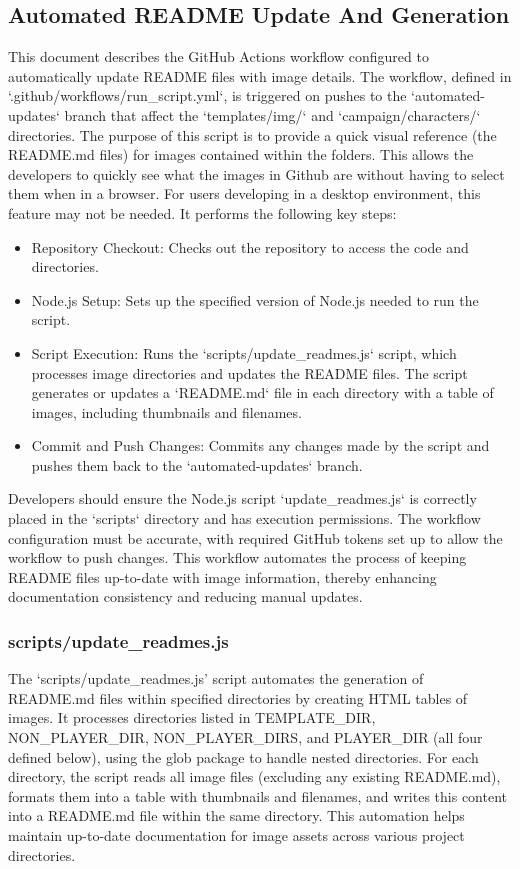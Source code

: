 \subsection{Automated README Update And Generation}


This document describes the GitHub Actions workflow configured to automatically update README files with image details. The workflow, defined in `.github/workflows/run\_script.yml`, is triggered on pushes to the `automated-updates` branch that affect the `templates/img/` and `campaign/characters/` directories. The purpose of this script is to provide a quick visual reference (the README.md files) for images contained within the folders. This allows the developers to quickly see what the images in Github are without having to select them when in a browser. For users developing in a desktop environment, this feature may not be needed. It performs the following key steps:

\begin{itemize}
\item Repository Checkout: Checks out the repository to access the code and directories.
\item Node.js Setup: Sets up the specified version of Node.js needed to run the script.
\item Script Execution: Runs the `scripts/update\_readmes.js` script, which processes image directories and updates the README files. The script generates or updates a `README.md` file in each directory with a table of images, including thumbnails and filenames.
\item Commit and Push Changes: Commits any changes made by the script and pushes them back to the `automated-updates` branch.
\end{itemize}

Developers should ensure the Node.js script `update\_readmes.js` is correctly placed in the `scripts` directory and has execution permissions. The workflow configuration must be accurate, with required GitHub tokens set up to allow the workflow to push changes. This workflow automates the process of keeping README files up-to-date with image information, thereby enhancing documentation consistency and reducing manual updates.


\subsubsection{scripts/update\_readmes.js}

The `scripts/update\_readmes.js' script automates the generation of README.md files within specified directories by creating HTML tables of images. It processes directories listed in TEMPLATE\_DIR, NON\_PLAYER\_DIR, NON\_PLAYER\_DIRS, and PLAYER\_DIR (all four defined below), using the glob package to handle nested directories. For each directory, the script reads all image files (excluding any existing README.md), formats them into a table with thumbnails and filenames, and writes this content into a README.md file within the same directory. This automation helps maintain up-to-date documentation for image assets across various project directories.

